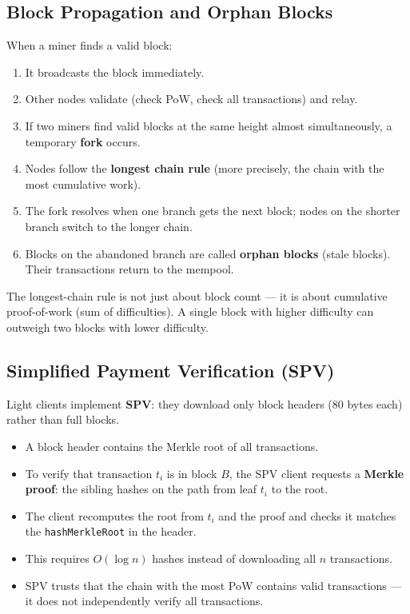 \documentclass[12pt,a4paper,openany]{book}
\theoremstyle{definition}
\theoremstyle{plain}
\theoremstyle{remark}
\begin{document}
\subsection{Block Propagation and Orphan Blocks}

When a miner finds a valid block:
\begin{enumerate}
  \item It broadcasts the block immediately.
  \item Other nodes validate (check PoW, check all transactions) and
        relay.
  \item If two miners find valid blocks at the same height almost
        simultaneously, a temporary \textbf{fork} occurs.
  \item Nodes follow the \textbf{longest chain rule} (more precisely,
        the chain with the most cumulative work).
  \item The fork resolves when one branch gets the next block; nodes on
        the shorter branch switch to the longer chain.
  \item Blocks on the abandoned branch are called \textbf{orphan blocks}
        (stale blocks).  Their transactions return to the mempool.
\end{enumerate}

\begin{keyinsight}
  The longest-chain rule is not just about block count — it is about
  cumulative proof-of-work (sum of difficulties).  A single block with
  higher difficulty can outweigh two blocks with lower difficulty.
\end{keyinsight}

\subsection{Simplified Payment Verification (SPV)}

Light clients implement \textbf{SPV}: they download only block headers
(80 bytes each) rather than full blocks.

\begin{itemize}
  \item A block header contains the Merkle root of all transactions.
  \item To verify that transaction $t_i$ is in block $B$, the SPV client
        requests a \textbf{Merkle proof}: the sibling hashes on the path
        from leaf $t_i$ to the root.
  \item The client recomputes the root from $t_i$ and the proof and
        checks it matches the \texttt{hashMerkleRoot} in the header.
  \item This requires $O(\log n)$ hashes instead of downloading all $n$
        transactions.
  \item SPV trusts that the chain with the most PoW contains valid
        transactions — it does not independently verify all transactions.
\end{itemize}
\end{document}
